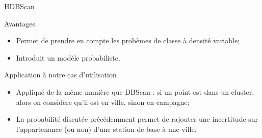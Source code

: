 \begin{frame}{HDBScan}
    \begin{block}{Avantages}
        \begin{itemize}
            \item Permet de prendre en compte les probèmes de classe à densité variable;
            \item Introduit un modèle probabiliste.
        \end{itemize}
    \end{block}

    \begin{block}{Application à notre cas d'utilisation}
        \begin{itemize}
            \item Appliqué de la même manière que DBScan : si un point est dans un cluster, alors on considère qu'il est en ville, sinon en campagne;
            \item La probabilité discutée précédemment permet de rajouter une incertitude sur l'appartenance (ou non) d'une station de base à une ville.
        \end{itemize}
    \end{block}
\end{frame}

